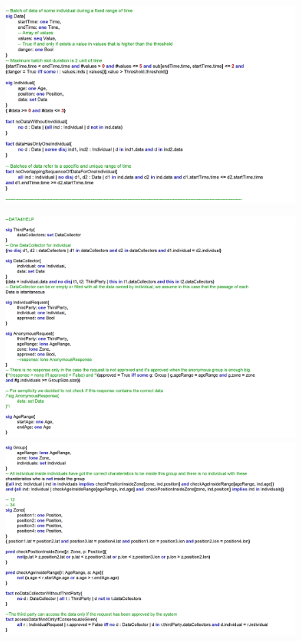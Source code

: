 \documentclass{article}
\begin{document}
\begin{legal}
\begin{figure}[H]
			\includegraphics[width=\linewidth]{./images/alloy/code/data4Help_2.PNG}
		\end{figure}
		\begin{figure}[H]
			\includegraphics[width=\linewidth]{./images/alloy/code/data4Help_3.PNG}
			\includegraphics[width=\linewidth]{./images/alloy/code/data4Help_4.PNG}

\end{figure}
\end{legal}
\end{document}
